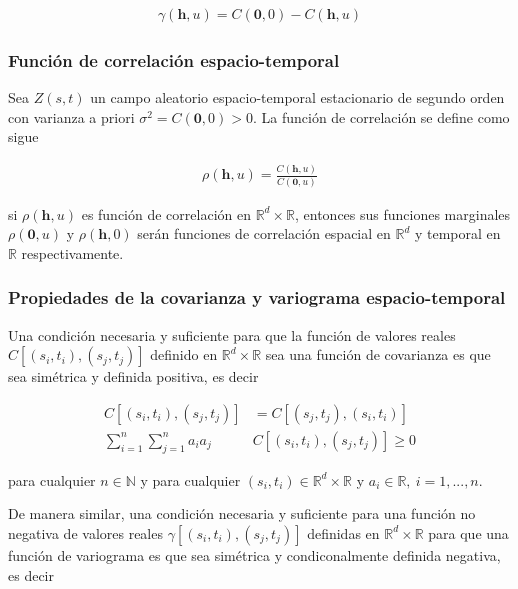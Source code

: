 \documentclass[
]{book}
\begin{document}
\begin{align}
\gamma(\textbf{h},u)=C(\textbf{0},0)-C(\textbf{h},u)
\end{align}

\hypertarget{funciuxf3n-de-correlaciuxf3n-espacio-temporal}{%
\subsubsection*{Función de correlación espacio-temporal}\label{funciuxf3n-de-correlaciuxf3n-espacio-temporal}}

Sea \(Z(s,t)\) un campo aleatorio espacio-temporal estacionario de segundo orden con varianza a priori \(\sigma^2 = C(\textbf{0},0)>0\). La función de correlación se define como sigue

\begin{align}
\rho(\textbf{h},u)=\frac{C(\textbf{h},u)}{C(\textbf{0},u)}
\end{align}

si \(\rho(\textbf{h},u)\) es función de correlación en \(\mathbb{R}^d \times \mathbb{R}\), entonces sus funciones marginales \(\rho(\textbf{0},u)\) y \(\rho(\textbf{h},0)\) serán funciones de correlación espacial en \(\mathbb{R}^d\) y temporal en \(\mathbb{R}\) respectivamente.

\hypertarget{propiedades-de-la-covarianza-y-variograma-espacio-temporal}{%
\subsubsection{Propiedades de la covarianza y variograma espacio-temporal}\label{propiedades-de-la-covarianza-y-variograma-espacio-temporal}}

Una condición necesaria y suficiente para que la función de valores reales \(C[(s_i,t_i),(s_j,t_j)]\) definido en \(\mathbb{R}^d \times \mathbb{R}\) sea una función de covarianza es que sea simétrica y definida positiva, es decir

\begin{align}
C[(s_i,t_i),(s_j,t_j)]&=C[(s_j,t_j),(s_i,t_i)]\\
\sum_
{i=1}^{n}\sum_
{j=1}^{n}a_ia_j&C[(s_i,t_i),(s_j,t_j)] \geq 0
\end{align}

para cualquier \(n\in \mathbb{N}\) y para cualquier \((s_i,t_i) \in \mathbb{R}^d \times \mathbb{R}\) y \(a_i\in \mathbb{R},\ i=1,...,n\).

De manera similar, una condición necesaria y suficiente para una función no negativa de valores reales \(\gamma[(s_i,t_i),(s_j,t_j)]\) definidas en \(\mathbb{R}^d \times \mathbb{R}\) para que una función de variograma es que sea simétrica y condiconalmente definida negativa, es decir
\end{document}
